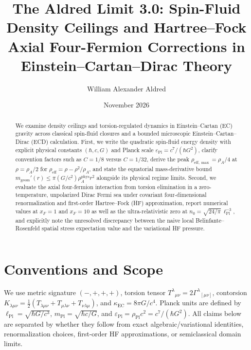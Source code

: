 \documentclass[11pt,a4paper]{article}
\title{The Aldred Limit 3.0: Spin-Fluid Density Ceilings and Hartree--Fock Axial Four-Fermion Corrections in Einstein--Cartan--Dirac Theory}
\author{William Alexander Aldred}
\date{November 2026}
\begin{document}
\maketitle

\begin{abstract}
We examine density ceilings and torsion-regulated dynamics in Einstein--Cartan (EC) gravity across classical spin-fluid closures and a bounded microscopic Einstein--Cartan--Dirac (ECD) calculation. First, we write the quadratic spin-fluid energy density with explicit physical constants $(\hbar, c, G)$ and Planck scale $\varepsilon_{\mathrm{Pl}} = c^7/(\hbar G^2)$, clarify convention factors such as $C = 1/8$ versus $C = 1/32$, derive the peak $\rho_{\mathrm{eff},\max} = \rho_A/4$ at $\rho = \rho_A/2$ for $\rho_{\mathrm{eff}} = \rho - \rho^2/\rho_A$, and state the equatorial mass-derivative bound $m_{\mathrm{geom}}'(r) \le \pi (G/c^2)\rho_A^{\mathrm{phys}} r^2$ alongside its physical regime limits. Second, we evaluate the axial four-fermion interaction from torsion elimination in a zero-temperature, unpolarized Dirac Fermi sea under covariant four-dimensional renormalization and first-order Hartree--Fock (HF) approximation, report numerical values at $x_F = 1$ and $x_F = 10$ as well as the ultra-relativistic zero at $n_0 = \sqrt{24/\pi}\,\ell_{\mathrm{Pl}}^{-3}$, and explicitly note the unresolved discrepancy between the naive local Belinfante--Rosenfeld spatial stress expectation value and the variational HF pressure.
\end{abstract}

\section{Conventions and Scope}
We use metric signature $(-,+,+,+)$, torsion tensor $T^\lambda{}_{\mu\nu} = 2\Gamma^\lambda{}_{[\mu\nu]}$, contorsion $K_{\lambda\mu\nu} = \frac{1}{2}(T_{\lambda\mu\nu} + T_{\mu\lambda\nu} + T_{\nu\lambda\mu})$, and $\kappa_{\mathrm{EC}} = 8\pi G/c^4$. Planck units are defined by $\ell_{\mathrm{Pl}} = \sqrt{\hbar G/c^3}$, $m_{\mathrm{Pl}} = \sqrt{\hbar c/G}$, and $\varepsilon_{\mathrm{Pl}} = \rho_{\mathrm{Pl}} c^2 = c^7/(\hbar G^2)$. All claims below are separated by whether they follow from exact algebraic/variational identities, renormalization choices, first-order HF approximations, or semiclassical domain limits.
\end{document}
